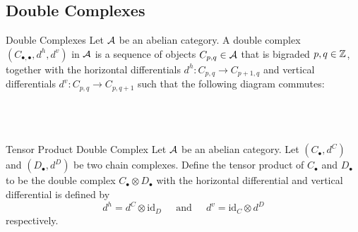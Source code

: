 \documentclass[a4paper]{article}
\begin{document}
\subsection{Double Complexes}
\begin{defn}{Double Complexes}{} Let $\mathcal{A}$ be an abelian category. A double complex $(C_{\bullet,\bullet},d^h,d^v)$ in $\mathcal{A}$ is a sequence of objects $C_{p,q}\in\mathcal{A}$ that is bigraded $p,q\in\mathbb{Z}$, together with the horizontal differentials $d^h:C_{p,q}\to C_{p+1,q}$ and vertical differentials $d^v:C_{p,q}\to C_{p,q+1}$ such that the following diagram commutes: \\~\\
\\~\\
\end{defn}

\begin{defn}{Tensor Product Double Complex}{} Let $\mathcal{A}$ be an abelian category. Let $(C_\bullet,d^C)$ and $(D_\bullet,d^D)$ be two chain complexes. Define the tensor product of $C_\bullet$ and $D_\bullet$ to be the double complex $C_\bullet\otimes D_\bullet$ with the horizontal differential and vertical differential is defined by $$d^h=d^C\otimes\text{id}_D\;\;\;\;\text{ and }\;\;\;\;d^v=\text{id}_C\otimes d^D$$ respectively. 
\end{defn}
\end{document}
